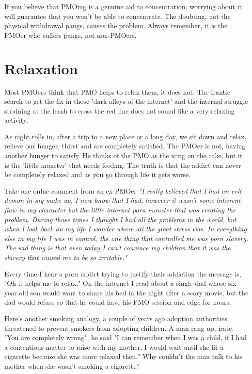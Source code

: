\documentclass[easypeasy.tex]{subfiles}
\begin{document}
If you believe that PMOing is a genuine aid to concentration, worrying about it will guarantee that you won't be able to concentrate. The doubting, not the physical withdrawal pangs, causes the problem. Always remember, it is the PMOer who suffers pangs, not non-PMOers.

\section{Relaxation}

Most PMOers think that PMO helps to relax them, it does not. The frantic search to get the fix in those 'dark alleys of the internet' and the internal struggle straining at the leash to cross the red line does not sound like a very relaxing activity.

As night rolls in, after a trip to a new place or a long day, we sit down and relax, relieve our hunger, thirst and are completely satisfied. The PMOer is not, having another hunger to satisfy. He thinks of the PMO as the icing on the cake, but it is the 'little monster' that needs feeding. The truth is that the addict can never be completely relaxed and as you go through life it gets worse.

Take one onlne comment from an ex-PMOer
  \textit{"I really believed that I had an evil demon in my make up, I now know that I had, however it wasn't some inherent flaw in my character but the little internet porn monster that was creating the problem. During those times I thought I had all the problems in the world, but when I look back on my life I wonder where all the great stress was. In everything else in my life I was in control, the one thing that controlled me was porn slavery. The sad thing is that even today I can't convince my children that it was the slavery that caused me to be so irritable."}

Every time I hear a porn addict trying to justify their addiction the message is, "Oh it helps me to relax." On the internet I read about a single dad whose six year old son would want to share his bed in the night after a scary movie, but the dad would refuse so that he could have his PMO session and edge for hours.

Here's another smoking analogy, a couple of years ago adoption authorities threatened to prevent smokers from adopting children. A man rang up, irate. "You are completely wrong", he said "I can remember when I was a child, if I had a contentious matter to raise with my mother, I would wait until she lit a cigarette because she was more relaxed then." Why couldn't the man talk to his mother when she wasn't smoking a cigarette?
\end{document}
